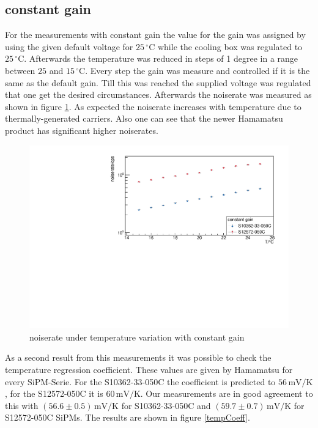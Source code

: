 \subsection{constant gain}
For the measurements with constant gain the value for the gain was assigned by using the given default voltage for $25\,\mathrm{^{\circ}C}$ while the cooling box was regulated to $25\,\mathrm{^{\circ}C}$. Afterwards the temperature was reduced in steps of 1 degree in a range between $25$ and $15\,\mathrm{^{\circ}C}$. Every step the gain was measure and controlled if it is the same as the default gain. Till this was reached the supplied voltage was regulated that one get the desired circumstances. Afterwards the noiserate was measured as shown in figure \ref{constGain_rate}.
As expected the noiserate increases with temperature due to thermally-generated carriers. Also one can see that the newer Hamamatsu product has significant higher noiserates.
\begin{figure}[h]
	\centering
	\includegraphics[width = 0.75 \textwidth]{Figures/radermacher/constGain_Rate.pdf}
	\caption{noiserate under temperature variation with constant gain}
	\label{constGain_rate}
\end{figure}
As a second result from this measurements it was possible to check the temperature regression coefficient. These values are given by Hamamatsu for every SiPM-Serie. For the S10362-33-050C the coefficient is predicted to $56\,\mathrm{mV/K}$, for the S12572-050C it is $60\,\mathrm{mV/K}$. Our measurements are in good agreement to this with $(56.6 \pm 0.5)\,\mathrm{mV/K}$ for S10362-33-050C and $(59.7 \pm 0.7)\,\mathrm{mV/K}$ for S12572-050C SiPMs. The results are shown in figure \ref{tempCoeff}. 
